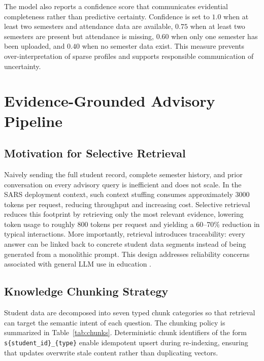\documentclass[conference]{IEEEtran}
\begin{document}
The model also reports a confidence score that communicates evidential completeness rather than predictive certainty. Confidence is set to $1.0$ when at least two semesters and attendance data are available, $0.75$ when at least two semesters are present but attendance is missing, $0.60$ when only one semester has been uploaded, and $0.40$ when no semester data exist. This measure prevents over-interpretation of sparse profiles and supports responsible communication of uncertainty.

\section{Evidence-Grounded Advisory Pipeline}
\subsection{Motivation for Selective Retrieval}
Naively sending the full student record, complete semester history, and prior conversation on every advisory query is inefficient and does not scale. In the SARS deployment context, such context stuffing consumes approximately 3000 tokens per request, reducing throughput and increasing cost. Selective retrieval reduces this footprint by retrieving only the most relevant evidence, lowering token usage to roughly 800 tokens per request and yielding a 60--70\% reduction in typical interactions. More importantly, retrieval introduces traceability: every answer can be linked back to concrete student data segments instead of being generated from a monolithic prompt. This design addresses reliability concerns associated with general LLM use in education \cite{kasneci2023chatgpt,lewis2020rag,gao2023rag}.

\subsection{Knowledge Chunking Strategy}
Student data are decomposed into seven typed chunk categories so that retrieval can target the semantic intent of each question. The chunking policy is summarized in Table~\ref{tab:chunks}. Deterministic chunk identifiers of the form \texttt{s\{student\_id\}\_\{type\}} enable idempotent upsert during re-indexing, ensuring that updates overwrite stale content rather than duplicating vectors.
\end{document}
